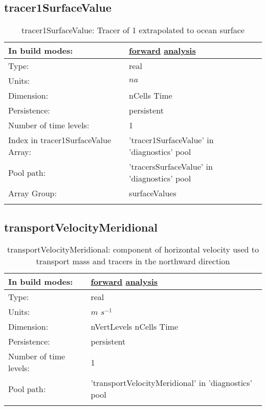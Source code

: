 \subsection[tracer1SurfaceValue]{tracer1SurfaceValue}
\label{subsec:var_sec_diagnostics_tracer1SurfaceValue}
\begin{center}
\begin{longtable}{| p{2.0in} | p{4.0in} |}
        \hline 
        In build modes: & \hyperref[subsec:forward_var_tab_diagnostics]{forward} \hyperref[subsec:analysis_var_tab_diagnostics]{analysis} \\
        \hline 
        Type: & real \\
        \hline 
        Units: & $na$ \\
        \hline 
        Dimension: & nCells Time \\
        \hline 
        Persistence: & persistent \\
        \hline 
        Number of time levels: & 1 \\
        \hline 
		 Index in tracer1SurfaceValue Array: & 'tracer1SurfaceValue' in 'diagnostics' pool \\
		 \hline 
            Pool path: & 'tracersSurfaceValue' in 'diagnostics' pool
 \\
		 \hline 
		 Array Group: & surfaceValues \\
		 \hline 
    \caption{tracer1SurfaceValue: Tracer of 1 extrapolated to ocean surface}
\end{longtable}
\end{center}
\subsection[transportVelocityMeridional]{transportVelocityMeridional}
\label{subsec:var_sec_diagnostics_transportVelocityMeridional}
\begin{center}
\begin{longtable}{| p{2.0in} | p{4.0in} |}
        \hline 
        In build modes: & \hyperref[subsec:forward_var_tab_diagnostics]{forward} \hyperref[subsec:analysis_var_tab_diagnostics]{analysis} \\
        \hline 
        Type: & real \\
        \hline 
        Units: & $m$ $s^{-1}$ \\
        \hline 
        Dimension: & nVertLevels nCells Time \\
        \hline 
        Persistence: & persistent \\
        \hline 
        Number of time levels: & 1 \\
        \hline 
            Pool path: & 'transportVelocityMeridional' in 'diagnostics' pool
 \\
		 \hline 
    \caption{transportVelocityMeridional: component of horizontal velocity used to transport mass and tracers in the northward direction}
\end{longtable}
\end{center}
